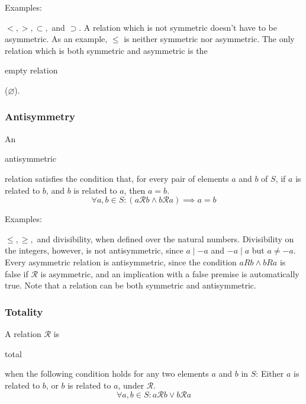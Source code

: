 \documentclass[11pt]{article}
\theoremstyle{plain}
\theoremstyle{definition}
\begin{document}
\noindent \begin{em}Examples:\end{em} $ <, >, \subset, $ and $ \supset $. A relation which is not symmetric doesn't have to be asymmetric. As an example, $ \le $ is neither symmetric nor asymmetric. The only relation which is both symmetric and asymmetric is the \begin{em}empty relation\end{em} ($ \varnothing $).

\subsubsection*{ Antisymmetry}
An \begin{em}antisymmetric\end{em} relation satisfies the condition that, for every pair of elements $ a $ and $ b $ of $ S $, if $ a $ is related to $ b $, and $ b $ is related to $ a $, then $ a = b $. 
\begin{displaymath}
  \forall a, b \in S : (a\mathcal{R}b \wedge b\mathcal{R}a) \implies a = b
\end{displaymath}

\noindent \begin{em}Examples:\end{em} $ \le, \ge, $ and divisibility, when defined over the natural numbers. Divisibility on the integers, however, is not antisymmetric, since $a \mid -a$ and $-a \mid a$ but $a \ne -a.$ Every asymmetric relation is antisymmetric, since the condition $ aRb \wedge bRa $ is false if $ \mathcal{R} $ is asymmetric, and an implication with a false premise is automatically true.
Note that a relation can be both symmetric and antisymmetric.

\subsubsection*{ Totality}
A relation $ \mathcal{R} $ is \begin{em}total\end{em} when the following condition holds for any two elements $ a $ and $ b $ in $ S $: Either $ a $ is related to $ b $, or $ b $ is related to $ a $, under $ \mathcal{R} $. %
\begin{displaymath}
	\forall a, b \in S : a\mathcal{R}b \vee b\mathcal{R}a
\end{displaymath}
\end{document}
